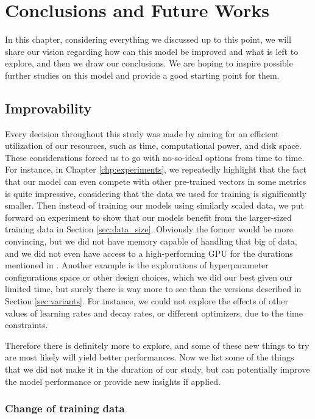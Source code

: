 
\chapter{Conclusions and Future Works}
\label{chp:conclusions}

In this chapter, considering everything we discussed up to this point, we will share our vision regarding how can this model be improved and what is left to explore, and then we draw our conclusions. We are hoping to inspire possible further studies on this model and provide a good starting point for them. 

\section{Improvability}

Every decision throughout this study was made by aiming for an efficient utilization of our resources, such as time, computational power, and disk space. These considerations forced us to go with no-so-ideal options from time to time. For instance, in Chapter \ref{chp:experiments}, we repeatedly highlight that the fact that our model can even compete with other pre-trained vectors in some metrics is quite impressive, considering that the data we used for training is significantly smaller. Then instead of training our models using similarly scaled data, we put forward an experiment to show that our models benefit from the larger-sized training data in Section \ref{sec:data_size}. Obviously the former would be more convincing, but we did not have memory capable of handling that big of data, and we did not even have access to a high-performing GPU for the durations mentioned in \cite{w2v2}. Another example is the explorations of hyperparameter configurations space or other design choices, which we did our best given our limited time, but surely there is way more to see than the versions described in Section \ref{sec:variants}. For instance, we could not explore the effects of other values of learning rates and decay rates, or different optimizers, due to the time constraints.

Therefore there is definitely more to explore, and some of these new things to try are most likely will yield better performances. Now we list some of the things that we did not make it in the duration of our study, but can potentially improve the model performance or provide new insights if applied.

\subsection{Change of training data}


